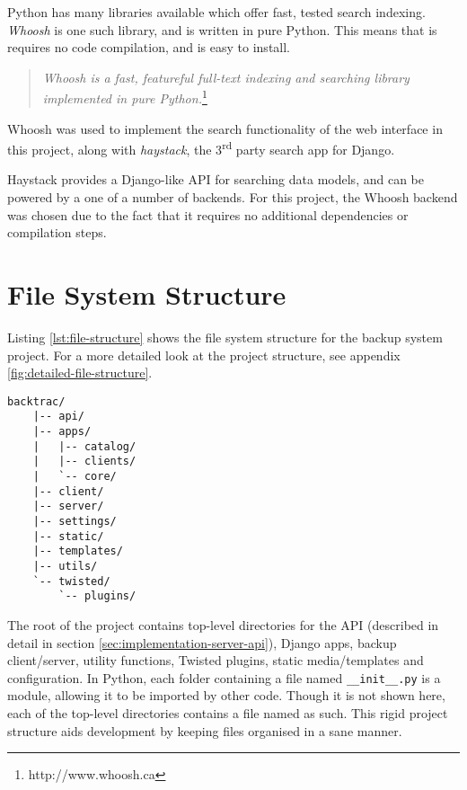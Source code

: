 Python has many libraries available which offer fast, tested search indexing.
\emph{Whoosh} is one such library, and is written in pure Python. This means
that is requires no code compilation, and is easy to install.

\begin{quote}
    \emph{Whoosh is a fast, featureful full-text indexing and searching library
    implemented in pure Python.}\footnote{http://www.whoosh.ca}
\end{quote}

Whoosh was used to implement the search functionality of the web interface in
this project, along with \emph{haystack}, the 3\textsuperscript{rd} party
search app for Django.

Haystack provides a Django-like API for searching data models, and can be
powered by a one of a number of backends. For this project, the Whoosh backend
was chosen due to the fact that it requires no additional dependencies or
compilation steps.

\section{File System Structure}
\label{sec:implementation-structure}

Listing \ref{lst:file-structure} shows the file system structure for the backup
system project. For a more detailed look at the project structure, see appendix
\ref{fig:detailed-file-structure}.

\noindent\begin{minipage}{\textwidth}
\begin{singlespacing}
\begin{lstlisting}[caption=Project file system structure,
    label=lst:file-structure]
    backtrac/
    |-- api/
    |-- apps/
    |   |-- catalog/
    |   |-- clients/
    |   `-- core/
    |-- client/
    |-- server/
    |-- settings/
    |-- static/
    |-- templates/
    |-- utils/
    `-- twisted/
        `-- plugins/
\end{lstlisting}
\end{singlespacing}
\end{minipage}

The root of the project contains top-level directories for the API (described
in detail in section \ref{sec:implementation-server-api}), Django apps, backup
client/server, utility functions, Twisted plugins, static media/templates and
configuration. In Python, each folder containing a file named
\verb!__init__.py! is a module, allowing it to be imported by other code.
Though it is not shown here, each of the top-level directories contains a file
named as such. This rigid project structure aids development by keeping files
organised in a sane manner.


